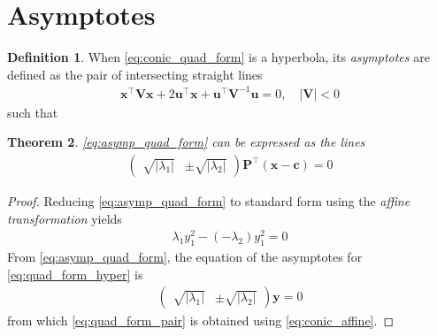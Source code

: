 \documentclass[]{interact}
\theoremstyle{plain}%
\newtheorem{theorem}{Theorem}[section]
\theoremstyle{definition}
\newtheorem{definition}[theorem]{Definition}
\theoremstyle{remark}
\providecommand{\abs}[1]{\lvert#1\rvert}
\providecommand{\brak}[1]{\ensuremath{\left(#1\right)}}
\newcommand{\myvec}[1]{\ensuremath{\begin{pmatrix}#1\end{pmatrix}}}
\let\vec\mathbf
\begin{document}
\section{Asymptotes}
\begin{definition}
  When \eqref{eq:conic_quad_form} is a hyperbola, its  {\em asymptotes}  are defined as the pair of intersecting straight lines 
  \begin{align}
  \label{eq:asymp_quad_form}
  \vec{x}^{\top}\vec{V}\vec{x}+2\vec{u}^{\top}\vec{x}+\vec{u}^{\top}\vec{V}^{-1}\vec{u}=0, \quad \abs{\vec{V}} < 0
  \end{align}
  such that 
  
  
\end{definition}
\begin{theorem}
  \eqref{eq:asymp_quad_form} can be expressed as the lines 
%
\begin{align} 
\label{eq:quad_form_pair}
\myvec{\sqrt{\abs{\lambda_1}} & \pm \sqrt{\abs{\lambda_2}}}\vec{P}^{\top}\brak{\vec{x}-\vec{c}} = 0
\end{align} 
\end{theorem}
\begin{proof}
  Reducing   \eqref{eq:asymp_quad_form} to standard form using the {\em affine transformation} yields
  \begin{align} 
    \lambda_1y_1^2 -\brak{-\lambda_2}y_1^2 = 0
    \label{eq:quad_form_hyper}
    \end{align}
    From \eqref{eq:asymp_quad_form},
    the equation of the asymptotes for \eqref{eq:quad_form_hyper} is
    \begin{align} 
    \myvec{\sqrt{\abs{\lambda_1}} & \pm \sqrt{\abs{\lambda_2}}}\vec{y} = 0
    \end{align} 
  from which \eqref{eq:quad_form_pair} is obtained using \eqref{eq:conic_affine}.
    
\end{proof}
\end{document}
